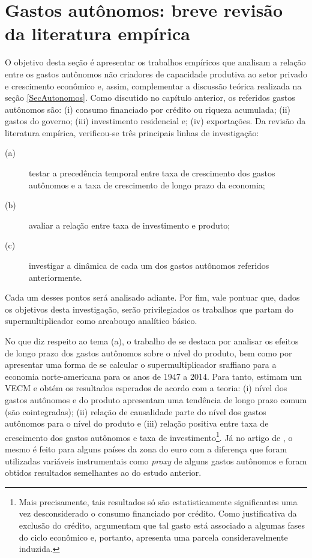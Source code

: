 \section{Gastos autônomos: breve revisão da literatura empírica}
\label{RevF}

O objetivo desta seção é apresentar os trabalhos empíricos que analisam a relação entre os gastos autônomos não criadores de capacidade produtiva ao setor privado e crescimento econômico e, assim, complementar a discussão teórica realizada na seção \ref{SecAutonomos}. Como discutido no capítulo anterior, os referidos gastos autônomos são:
(i) consumo financiado por crédito ou riqueza acumulada;
(ii) gastos do governo;
(iii) investimento residencial e;
(iv) exportações. 
Da revisão da literatura empírica, verificou-se três principais linhas de investigação: 
\begin{description}
	\item[(a)] testar a precedência temporal entre taxa de crescimento dos gastos autônomos e a taxa de crescimento de longo prazo da economia; 
	\item[(b)] avaliar a relação entre taxa de investimento e produto;
	\item[(c)] investigar a dinâmica de cada um dos gastos autônomos referidos anteriormente.
\end{description}
Cada um desses pontos será analisado adiante. Por fim, vale pontuar que, dados os objetivos desta investigação, serão privilegiados os trabalhos que partam do supermultiplicador como arcabouço analítico básico.

No que diz respeito ao tema (a), o trabalho de \textcite{girardi_long-run_2016} se destaca por analisar os efeitos de longo prazo dos gastos autônomos sobre  o nível do produto, bem como por apresentar uma forma de se calcular o supermultiplicador sraffiano para a economia norte-americana para os anos de 1947 a 2014. Para tanto, estimam um VECM e obtém os resultados esperados de acordo com a teoria: (i) nível dos gastos autônomos e do produto apresentam uma tendência de longo prazo comum  (são cointegradas); (ii) relação de causalidade parte do nível dos gastos autônomos para o nível do produto e (iii) relação positiva entre taxa de crescimento dos gastos autônomos e taxa de investimento\footnote{
	Mais precisamente, tais resultados só são estatisticamente significantes uma vez desconsiderado o consumo financiado por crédito. Como justificativa da exclusão do crédito, \textcite[p.~13]{girardi_long-run_2016} argumentam que tal gasto está associado a algumas fases do ciclo econômico e, portanto, apresenta uma parcela consideravelmente induzida.
}. Já no artigo de \textcite{girardi_autonomous_2018}, o mesmo é feito para alguns países da zona do euro com a diferença que foram utilizadas variáveis instrumentais como \textit{proxy} de alguns gastos autônomos e foram obtidos resultados semelhantes ao do estudo anterior. 

